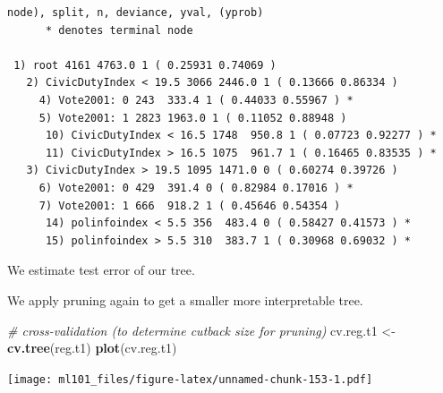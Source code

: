 \documentclass[]{article}
\newenvironment{Shaded}{\begin{snugshade}}{\end{snugshade}}
\newcommand{\CommentTok}[1]{\textcolor[rgb]{0.56,0.35,0.01}{\textit{#1}}}
\newcommand{\DataTypeTok}[1]{\textcolor[rgb]{0.13,0.29,0.53}{#1}}
\newcommand{\DecValTok}[1]{\textcolor[rgb]{0.00,0.00,0.81}{#1}}
\newcommand{\KeywordTok}[1]{\textcolor[rgb]{0.13,0.29,0.53}{\textbf{#1}}}
\newcommand{\NormalTok}[1]{#1}
\newcommand{\OperatorTok}[1]{\textcolor[rgb]{0.81,0.36,0.00}{\textbf{#1}}}
\newcommand{\OtherTok}[1]{\textcolor[rgb]{0.56,0.35,0.01}{#1}}
\newcommand{\StringTok}[1]{\textcolor[rgb]{0.31,0.60,0.02}{#1}}
\begin{document}
\begin{verbatim}
node), split, n, deviance, yval, (yprob)
      * denotes terminal node

 1) root 4161 4763.0 1 ( 0.25931 0.74069 )  
   2) CivicDutyIndex < 19.5 3066 2446.0 1 ( 0.13666 0.86334 )  
     4) Vote2001: 0 243  333.4 1 ( 0.44033 0.55967 ) *
     5) Vote2001: 1 2823 1963.0 1 ( 0.11052 0.88948 )  
      10) CivicDutyIndex < 16.5 1748  950.8 1 ( 0.07723 0.92277 ) *
      11) CivicDutyIndex > 16.5 1075  961.7 1 ( 0.16465 0.83535 ) *
   3) CivicDutyIndex > 19.5 1095 1471.0 0 ( 0.60274 0.39726 )  
     6) Vote2001: 0 429  391.4 0 ( 0.82984 0.17016 ) *
     7) Vote2001: 1 666  918.2 1 ( 0.45646 0.54354 )  
      14) polinfoindex < 5.5 356  483.4 0 ( 0.58427 0.41573 ) *
      15) polinfoindex > 5.5 310  383.7 1 ( 0.30968 0.69032 ) *
\end{verbatim}

We estimate test error of our tree.

\begin{Shaded}
\end{Shaded}

We apply pruning again to get a smaller more interpretable tree.

\begin{Shaded}
\begin{Highlighting}[]
\CommentTok{# cross-validation (to determine cutback size for pruning)}
\NormalTok{cv.reg.t1 <-}\StringTok{ }\KeywordTok{cv.tree}\NormalTok{(reg.t1)}
\KeywordTok{plot}\NormalTok{(cv.reg.t1)}
\end{Highlighting}
\end{Shaded}

\texttt{[image: ml101\_files/figure-latex/unnamed-chunk-153-1.pdf]}

\begin{Shaded}
\end{Shaded}
\end{document}
